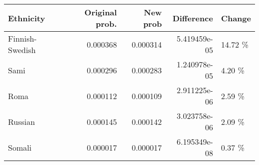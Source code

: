 \begin{tabular}{lrrrl}
\toprule
      Ethnicity &  Original prob. &  New prob &   Difference &  Change \\
\midrule
Finnish-Swedish &        0.000368 &  0.000314 & 5.419459e-05 & 14.72 \% \\
           Sami &        0.000296 &  0.000283 & 1.240978e-05 &  4.20 \% \\
           Roma &        0.000112 &  0.000109 & 2.911225e-06 &  2.59 \% \\
        Russian &        0.000145 &  0.000142 & 3.023758e-06 &  2.09 \% \\
         Somali &        0.000017 &  0.000017 & 6.195349e-08 &  0.37 \% \\
\bottomrule
\end{tabular}
